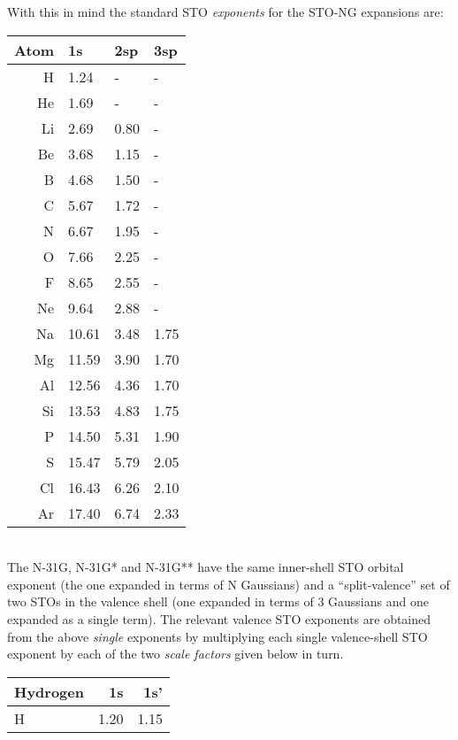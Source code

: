 With this in mind the standard STO {\em exponents} for the STO-NG
expansions are: \\
\begin{center}
\begin{tabular}{|r|l|l|l|}
\hline
Atom &  1s &  2sp & 3sp \\
\hline
H   &  1.24 & - & - \\
He  &  1.69 & - & - \\
Li  &  2.69 & 0.80 & - \\
Be  &  3.68 & 1.15 & - \\
B   &  4.68 & 1.50 & - \\
C   &  5.67 & 1.72 & - \\
N   &  6.67 & 1.95 & - \\
O    & 7.66 & 2.25 & - \\
F & 8.65 & 2.55 & - \\
Ne & 9.64 & 2.88 & - \\
Na & 10.61 & 3.48 & 1.75  \\
Mg & 11.59 & 3.90 & 1.70  \\
Al & 12.56 & 4.36 & 1.70  \\
Si & 13.53 & 4.83 & 1.75  \\
P & 14.50 & 5.31 & 1.90 \\
S & 15.47 & 5.79 & 2.05  \\
Cl & 16.43 & 6.26 & 2.10  \\
Ar & 17.40 & 6.74 & 2.33  \\
\hline
\end{tabular}
\end{center}
\ \\
The N-31G, N-31G* and N-31G** have the same inner-shell
STO orbital exponent (the one expanded in terms of N Gaussians)
and a ``split-valence'' set of two STOs in the valence shell
(one expanded in terms of 3 Gaussians and one expanded as a single term).
The relevant valence STO exponents are obtained from the above
{\em single } exponents by multiplying each single valence-shell
STO exponent by each of the two {\em scale factors} given below in turn.
\ \\
\begin{center}
\begin{tabular}{|l|r|r|}
\hline
Hydrogen & 1s & 1s'  \\
\hline
H & 1.20 & 1.15  \\
\hline
\end{tabular}
\end{center}
\ \\
